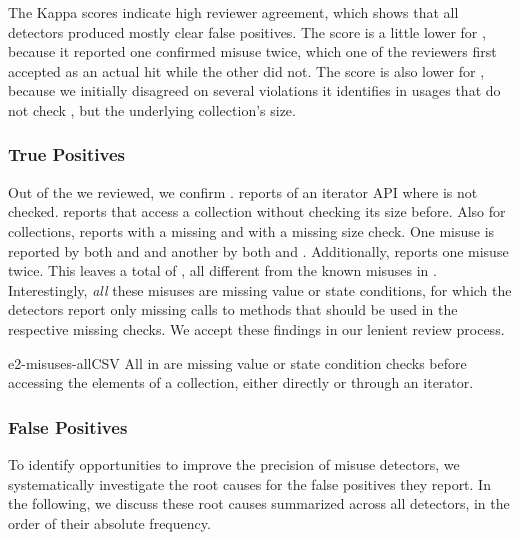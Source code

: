 The Kappa scores indicate high reviewer agreement, which shows that all detectors produced mostly clear false positives.
The score is a little lower for \Tikanga, because it reported one confirmed misuse twice, which one of the reviewers first accepted as an actual hit while the other did not.
The score is also lower for \DMMC, because we initially disagreed on several violations it identifies in  usages that do not check , but the underlying collection's size.

\subsubsection*{True Positives}

Out of the  we reviewed, we confirm .
%
\DMMC reports  of an iterator API where  is not checked.
\Jadet reports  that access a collection without checking its size before.
Also for collections, \Tikanga reports  with a missing  and  with a missing size check.
One misuse is reported by both \Tikanga and \Jadet and another by both \Tikanga and \DMMC.
Additionally, \Jadet reports one misuse twice.
This leaves a total of , all different from the known misuses in \MUBench.
%
Interestingly, \emph{all} these misuses are missing value or state conditions, for which the detectors report only missing calls to methods that should be used in the respective missing checks.
We accept these findings in our lenient review process.


\begin{obs}{e2-misuses-allCSV}
  All  in  are missing value or state condition checks before accessing the elements of a collection, either directly or through an iterator.
\end{obs}

\subsubsection*{False Positives}

To identify opportunities to improve the precision of misuse detectors, we systematically investigate the root causes for the false positives they report.
In the following, we discuss these root causes summarized across all detectors, in the order of their absolute frequency.

